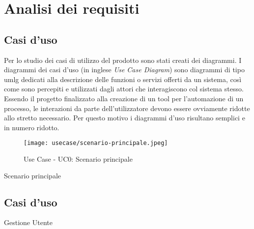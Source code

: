 \chapter{Analisi dei requisiti}
\label{chap:analisi-requisiti}

\section{Casi d'uso}

Per lo studio dei casi di utilizzo del prodotto sono stati creati dei diagrammi.
I diagrammi dei casi d'uso (in inglese \emph{Use Case Diagram}) sono diagrammi di tipo \gls{umlg} dedicati alla descrizione delle funzioni o servizi offerti da un sistema, così come sono percepiti e utilizzati dagli attori che interagiscono col sistema stesso.
Essendo il progetto finalizzato alla creazione di un tool per l'automazione di un processo, le interazioni da parte dell'utilizzatore devono essere ovviamente ridotte allo stretto necessario. Per questo motivo i diagrammi d'uso risultano semplici e in numero ridotto.

\begin{figure}[ht] 
    \centering 
    \texttt{[image: usecase/scenario-principale.jpeg]} 
    \caption{Use Case - UC0: Scenario principale}
    \label{fig:scenario_principale}
\end{figure}

\begin{usecase}{0}{Scenario principale}
    \label{uc:scenario_principale}
\end{usecase}

\section{Casi d'uso}
\begin{usecase}{1}{Gestione Utente}
    \label{uc:gestione_utente}
\end{usecase}

